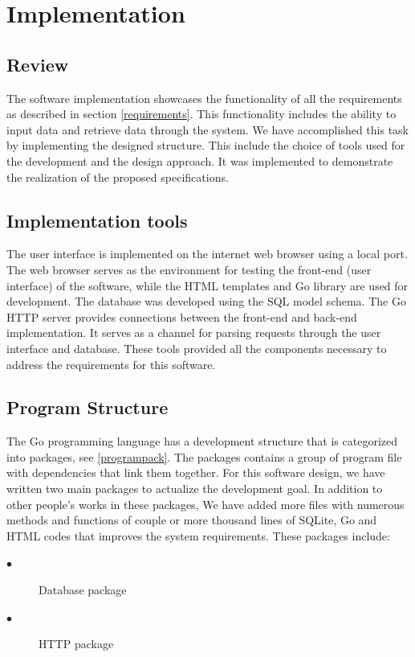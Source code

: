 \chapter{Implementation}
\label{chap:ch4_abbr}
\label{chap:figtab}
\section{Review}
The software implementation showcases the functionality of all the requirements as described in section \ref{requirements}. This functionality includes the ability to input data and retrieve data through the system. We have accomplished this task by implementing the designed structure. This include the choice of tools used for the development and the design approach. It was implemented to demonstrate the realization of the proposed specifications.
\section{Implementation tools}
The user interface is implemented on the internet web browser using a local port. The web browser serves as the environment for testing the front-end (user interface) of the software, while the HTML templates and Go library are used for development. The database was developed using the SQL model schema. The Go HTTP server provides connections between the front-end and back-end implementation. It serves as a channel for parsing requests through the user interface and database. These tools provided all the components necessary to address the requirements for this software. 
\section{Program Structure} \label{Programstructure}
The Go programming language has a development structure that is categorized into packages, see \autoref{programpack}. The packages contains a group of program file with dependencies that link them together. For this software design, we have written two main packages to actualize the development goal. In addition to other people's works in these packages, We have added more files with numerous methods and functions of couple or more thousand lines of SQLite, Go and HTML codes that improves the system requirements. These packages include:
\begin{description}
\item[$\bullet$]Database package 
\item[$\bullet$]HTTP package 
\end{description}

